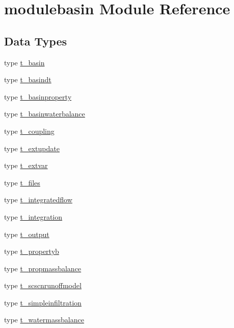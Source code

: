 \hypertarget{namespacemodulebasin}{}\section{modulebasin Module Reference}
\label{namespacemodulebasin}
\subsection*{Data Types}
\begin{DoxyCompactItemize}
\item 
type \mbox{\hyperlink{structmodulebasin_1_1t__basin}{t\+\_\+basin}}
\item 
type \mbox{\hyperlink{structmodulebasin_1_1t__basindt}{t\+\_\+basindt}}
\item 
type \mbox{\hyperlink{structmodulebasin_1_1t__basinproperty}{t\+\_\+basinproperty}}
\item 
type \mbox{\hyperlink{structmodulebasin_1_1t__basinwaterbalance}{t\+\_\+basinwaterbalance}}
\item 
type \mbox{\hyperlink{structmodulebasin_1_1t__coupling}{t\+\_\+coupling}}
\item 
type \mbox{\hyperlink{structmodulebasin_1_1t__extupdate}{t\+\_\+extupdate}}
\item 
type \mbox{\hyperlink{structmodulebasin_1_1t__extvar}{t\+\_\+extvar}}
\item 
type \mbox{\hyperlink{structmodulebasin_1_1t__files}{t\+\_\+files}}
\item 
type \mbox{\hyperlink{structmodulebasin_1_1t__integratedflow}{t\+\_\+integratedflow}}
\item 
type \mbox{\hyperlink{structmodulebasin_1_1t__integration}{t\+\_\+integration}}
\item 
type \mbox{\hyperlink{structmodulebasin_1_1t__output}{t\+\_\+output}}
\item 
type \mbox{\hyperlink{structmodulebasin_1_1t__propertyb}{t\+\_\+propertyb}}
\item 
type \mbox{\hyperlink{structmodulebasin_1_1t__propmassbalance}{t\+\_\+propmassbalance}}
\item 
type \mbox{\hyperlink{structmodulebasin_1_1t__scscnrunoffmodel}{t\+\_\+scscnrunoffmodel}}
\item 
type \mbox{\hyperlink{structmodulebasin_1_1t__simpleinfiltration}{t\+\_\+simpleinfiltration}}
\item 
type \mbox{\hyperlink{structmodulebasin_1_1t__watermassbalance}{t\+\_\+watermassbalance}}
\end{DoxyCompactItemize}

